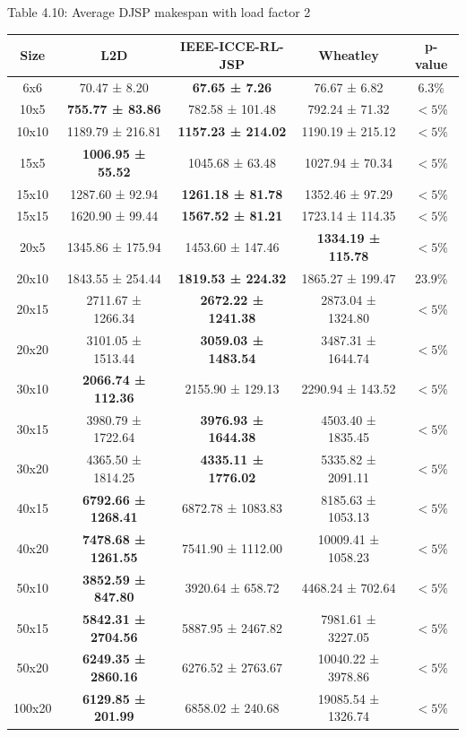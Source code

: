 \begin{table}
    Table 4.10: Average DJSP makespan with load factor 2\\
    \vspace{1mm}
    \label{table:4.7}
    \footnotesize 
    \begin{tabular}{ccccc}
    \toprule
    Size & L2D & IEEE-ICCE-RL-JSP & Wheatley & p-value \\
    \midrule
    6x6 & 70.47 ± 8.20 & \textbf{67.65 ± 7.26} & 76.67 ± 6.82 & 6.3$\%$ \\
    10x5 & \textbf{755.77 ± 83.86} & 782.58 ± 101.48 & 792.24 ± 71.32 & $< 5\%$ \\
    10x10 & 1189.79 ± 216.81 & \textbf{1157.23 ± 214.02} & 1190.19 ± 215.12 & $< 5\%$ \\
    15x5 & \textbf{1006.95 ± 55.52} & 1045.68 ± 63.48 & 1027.94 ± 70.34 & $< 5\%$ \\
    15x10 & 1287.60 ± 92.94 & \textbf{1261.18 ± 81.78} & 1352.46 ± 97.29 & $< 5\%$ \\
    15x15 & 1620.90 ± 99.44 & \textbf{1567.52 ± 81.21} & 1723.14 ± 114.35 & $< 5\%$ \\
    20x5 & 1345.86 ± 175.94 & 1453.60 ± 147.46 & \textbf{1334.19 ± 115.78} & $< 5\%$ \\
    20x10 & 1843.55 ± 254.44 & \textbf{1819.53 ± 224.32} & 1865.27 ± 199.47 & 23.9$\%$ \\
    20x15 & 2711.67 ± 1266.34 & \textbf{2672.22 ± 1241.38} & 2873.04 ± 1324.80 & $< 5\%$ \\
    20x20 & 3101.05 ± 1513.44 & \textbf{3059.03 ± 1483.54} & 3487.31 ± 1644.74 & $< 5\%$ \\
    30x10 & \textbf{2066.74 ± 112.36} & 2155.90 ± 129.13 & 2290.94 ± 143.52 & $< 5\%$ \\
    30x15 & 3980.79 ± 1722.64 & \textbf{3976.93 ± 1644.38} & 4503.40 ± 1835.45 & $< 5\%$ \\
    30x20 & 4365.50 ± 1814.25 & \textbf{4335.11 ± 1776.02} & 5335.82 ± 2091.11 & $< 5\%$ \\
    40x15 & \textbf{6792.66 ± 1268.41} & 6872.78 ± 1083.83 & 8185.63 ± 1053.13 & $< 5\%$ \\
    40x20 & \textbf{7478.68 ± 1261.55} & 7541.90 ± 1112.00 & 10009.41 ± 1058.23 & $< 5\%$ \\
    50x10 & \textbf{3852.59 ± 847.80} & 3920.64 ± 658.72 & 4468.24 ± 702.64 & $< 5\%$ \\
    50x15 & \textbf{5842.31 ± 2704.56} & 5887.95 ± 2467.82 & 7981.61 ± 3227.05 & $< 5\%$ \\
    50x20 & \textbf{6249.35 ± 2860.16} & 6276.52 ± 2763.67 & 10040.22 ± 3978.86 & $< 5\%$ \\
    100x20 & \textbf{6129.85 ± 201.99} & 6858.02 ± 240.68 & 19085.54 ± 1326.74 & $< 5\%$ \\
    \bottomrule
    \end{tabular}
\end{table}
    
